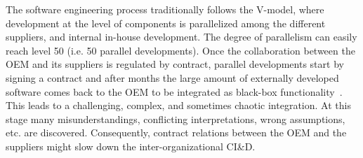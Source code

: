 The software engineering process traditionally follows the V-model, %
where development at the level of components is parallelized among the different suppliers, and internal in-house development. The degree of parallelism can easily reach level 50 (i.e. 50 parallel developments). Once the collaboration between the OEM and its suppliers is regulated by contract, parallel developments %
start by signing a contract and  after months the large amount of externally developed software comes back to the OEM to be integrated as black-box functionality~\cite{Broy:2006:CAS:1134285.1134292}. 
This leads to a challenging, complex, and sometimes chaotic integration. %
At this stage %
many misunderstandings, conflicting interpretations, wrong assumptions, etc. are discovered.
Consequently, %
contract relations between the OEM and the suppliers might slow down the inter-organizational CI\&D.  %


